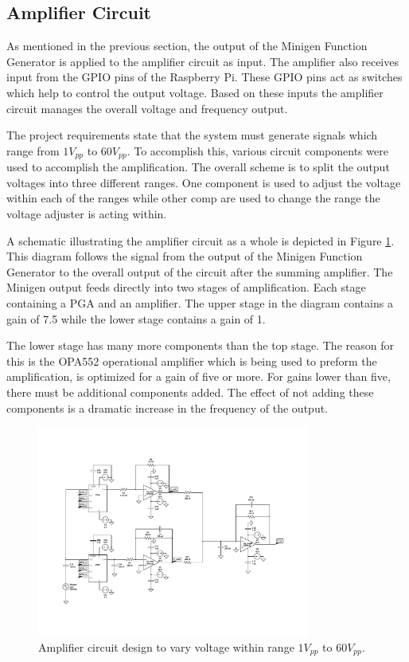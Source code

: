 \documentclass{article}	%
\begin{document}
\begin{multicols}{2}
\subsection{Amplifier Circuit}
As mentioned in the previous section,
the output of the Minigen Function Generator
is applied to the amplifier circuit as input.
The amplifier also receives input from 
the GPIO pins of the Raspberry Pi.
These GPIO pins act as switches which help to control the output voltage.
Based on these inputs 
the amplifier circuit manages the overall 
voltage and frequency output.

The project requirements state that the system must 
generate signals which range from $1V_{pp}$ to $60V_{pp}$. 
To accomplish this,
various circuit components were used to accomplish the amplification.
The overall scheme is to split the output voltages into
three different ranges.
One component is used to adjust the voltage within each of the ranges while
other comp are used to change the range the voltage adjuster is acting within.

A schematic illustrating the amplifier circuit as a whole is 
depicted in Figure \ref{figure_amplifier_circuit}.
This diagram follows the signal from
the output of the Minigen Function Generator to
the overall output of the circuit after the summing amplifier.
The Minigen output feeds directly into two stages of amplification.
Each stage containing a PGA and an amplifier.
The upper stage in the diagram contains a gain of 7.5 while
the lower stage contains a gain of 1.

The lower stage has many more components than the top stage.
The reason for this is the OPA552 operational amplifier which is
being used to preform the amplification,
is optimized for a gain of five or more.
For gains lower than five,
there must be additional components added.
The effect of not adding these components is a dramatic
increase in the frequency of the output.

\begin{figure}[!hbt]
\begin{center}
\includegraphics[width=0.8\textwidth,keepaspectratio]{circuit_diagram.pdf}
\end{center}
\caption{Amplifier circuit design to vary voltage 
    within range $1V_{pp}$ to $60V_{pp}$. }
\label{figure_amplifier_circuit}
\end{figure}


\end{multicols}
\end{document}

